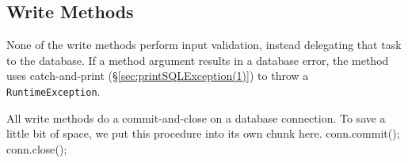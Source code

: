 \documentclass{article}
\def\nwendcode{\endtrivlist \endgroup}      %
\let\nwdocspar=\par
\theoremstyle{definition}                   %
\begin{document}
\subsection{Write Methods}
\label{sec:write-methods}
None of the write methods perform input validation, instead delegating that
task to the database. If a method argument results in a database error, the
method uses catch-and-print (\S\ref{sec:printSQLException(1)}) to throw a
{\tt{}RuntimeException}.

All write methods do a commit-and-close on a database connection. To save
a little bit of space, we put this procedure into its own chunk here.
\nwenddocs{}\endmoddef{}
conn.commit();
conn.close();
\nwendcode{}\nwdocspar
\end{document}
